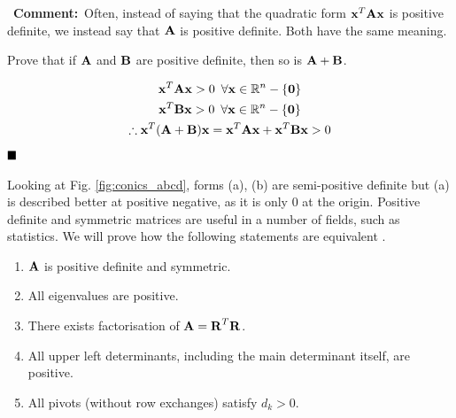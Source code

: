 \documentclass[a4paper]{article}
\numberwithin{equation}{section} %
\newcommand{\setRn}{\mathbb{R}^n} %
\newcommand{\qedblack}{$\hfill\blacksquare$} %
\newcommand{\hquad}{\hskip0.5em\relax}%
\newcommand{\B}[1]{\textbf{\textup{#1}}} %
\newcommand{\mycomment}[1]{\begin{leftrightbox}\Pointinghand~\textbf{Comment:}~#1 \end{leftrightbox}}
\begin{document}
\mycomment{Often, instead of saying that the quadratic form $\B{x}^T\B{Ax}$ is positive definite, we instead say that $\B{A}$ is positive definite. Both have the same meaning.
} %
\begin{exmp}
Prove that if $\B{A}$ and $\B{B}$ are positive definite, then so is $\B{A}+\B{B}$.
\end{exmp}
\begin{TheSolution}
\[
\begin{gathered}
\B{x}^{T}\B{Ax} > 0 \hquad \forall \B{x} \in \setRn -\{\B{0}\}\\
\B{x}^{T}\B{Bx} > 0 \hquad \forall \B{x} \in \setRn -\{\B{0}\}\\
\therefore \B{x}^{T}(\B{A}+\B{B})\B{x} = \B{x}^{T}\B{Ax} + \B{x}^{T}\B{Bx} > 0
\end{gathered}
\]
\qedblack
\end{TheSolution}

Looking at Fig. \ref{fig:conics_abcd}, forms (a), (b) are semi-positive definite but (a) is described better at positive negative, as it is only $0$ at the origin. Positive definite and symmetric matrices are useful in a number of fields, such as statistics. We will prove how the following statements are equivalent \cite{chen_lec_notes}. 

\begin{enumerate} [label=(\alph*)]
  \item $\B{A}$ is positive definite and symmetric.
  \item All eigenvalues are positive.
  \item There exists factorisation of $\B{A}=\B{R}^{T}\B{R}$.
  \item All upper left determinants, including the main determinant itself, are positive.
  \item All pivots (without row exchanges) satisfy $d_{k}>0$.
\end{enumerate}
\end{document}
